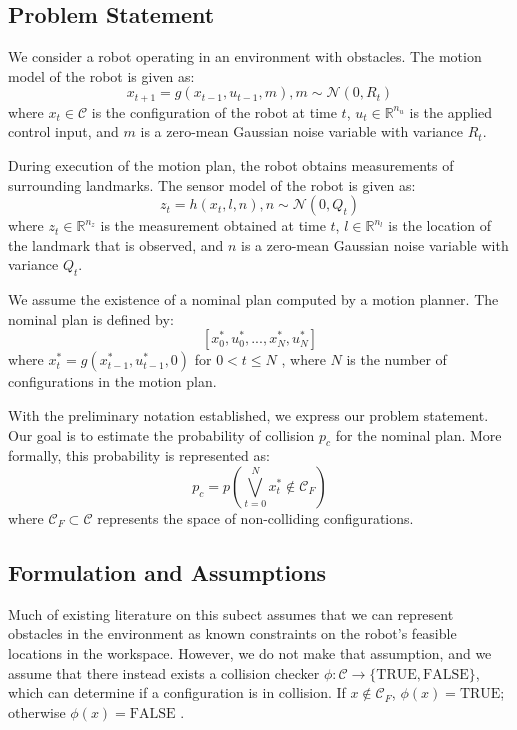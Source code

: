 \documentclass[journal]{IEEEtran}
\begin{document}
\subsection{Problem Statement}
We consider a robot operating in an environment with obstacles.%
The motion model of the robot is given as:
$$x_{t+1} = g(x_{t-1}, u_{t-1}, m), m \sim \mathcal{N}(0,R_t)$$
where $x_t \in \mathcal{C}$ is the configuration of the robot at time $t$, $u_t \in\mathbb{R}^{n_u}$ is the applied control input, and $m$ is a zero-mean Gaussian noise variable with variance $R_t$.

During execution of the motion plan, the robot obtains measurements of surrounding landmarks. The sensor model of the robot is given as:
$$z_t = h(x_t,l,n), n \sim \mathcal{N}(0,Q_t)$$
where $z_t \in \mathbb{R}^{n_z}$ is the measurement obtained at time $t$, $l \in \mathbb{R}^{n_l}$ is the location of the landmark that is observed, and $n$ is a zero-mean Gaussian noise variable with variance $Q_t$.

We assume the existence of a nominal plan computed by a motion planner. The nominal plan is defined by:
$$[x_0^*,u_0^*,...,x_N^*,u_N^*]$$
where $x_t^* = g(x_{t-1}^*,u_{t-1}^*,0)$ for $0 < t \leq N$ , where $N$ is the number of configurations in the motion plan.

With the preliminary notation established, we express our problem statement. Our goal is to estimate the probability of collision $p_c$ for the nominal plan. More formally, this probability is represented as:
$$p_c = p\left(\bigvee\limits_{t=0}^N x_t^* \notin \mathcal{C}_F \right)$$
where $\mathcal{C}_F \subset \mathcal{C}$ represents the space of non-colliding configurations.

\subsection{Formulation and Assumptions}

Much of existing literature on this subect assumes that we can represent obstacles in the environment as known constraints on the robot's feasible locations in the workspace. However, we do not make that assumption, and we assume that there instead exists a collision checker $\phi: \mathcal{C} \rightarrow \{\text{TRUE},\text{FALSE}\}$, which can determine if a configuration is in collision. If $x\notin \mathcal{C}_F$, $\phi(x) = \text{TRUE}$; otherwise $\phi(x) = \text{FALSE}$ \cite{IEEEhowto:lavalle}.
\end{document}
